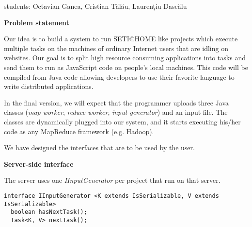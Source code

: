 \documentclass{article}
\begin{document}
students: Octavian Ganea, Cristian Tălău, Laurențiu Dascălu

\textbf{Problem statement}

Our idea is to build a system to run SETI@HOME like projects which execute 
multiple tasks on the machines of ordinary Internet users that are idling 
on websites. Our goal is to split high resource consuming applications into 
tasks and send them to run as JavaScript code on people's local machines. 
This code will be compiled from Java code allowing developers to use their 
favorite language to write distributed applications.

In the final version, we will expect that the programmer uploads three Java 
classes (\emph{map worker}, \emph{reduce worker}, \emph{input generator}) and 
an input file. The classes are dynamically plugged into our system, and it
starts executing his/her code as any MapReduce framework (e.g.
Hadoop). %

We have designed the interfaces that are to be used by the user. 

\textbf{Server-side interface}



The server uses one \emph{IInputGenerator} per project that run on that server.

\begin{lstlisting}
interface IInputGenerator <K extends IsSerializable, V extends IsSerializable>
  boolean hasNextTask();
  Task<K, V> nextTask();
\end{lstlisting}
\end{document}
